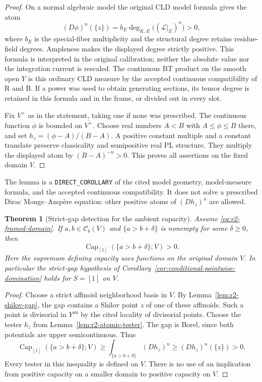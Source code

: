 \documentclass[11pt,a4paper]{article}
\numberwithin{equation}{section}
\newtheorem{theorem}{Theorem}[section]
\theoremstyle{definition}
\theoremstyle{remark}
\newcommand{\Cb}{\mathcal C_b}
\begin{document}
\begin{proof}
On a normal algebraic model the original CLD model formula gives the
atom
\[
 (D\phi)^n(\{z\})
   =b_E\deg_{\widetilde K,E}\bigl((\mathscr L|_E)^n\bigr)>0,
\]
where $b_E$ is the special-fiber multiplicity and the structural degree
retains residue-field degrees. Ampleness makes the displayed degree
strictly positive. This formula is interpreted in the original
calibration; neither the absolute value nor the integration current
is rescaled. The continuous BT product on the smooth open $Y$ is this
ordinary CLD measure by the accepted continuous compatibility of
\textup{R} and \textup{B}. If a power was used to obtain generating
sections, its tensor degree is retained in this formula and in the
frame, or divided out in every slot.

Fix $V^+$ as in the statement, taking one if none was prescribed.
The continuous function $\phi$ is bounded on $\overline {V^+}$. Choose
real numbers $A<B$ with
$A\leq\phi\leq B$ there, and set $h_z=(\phi-A)/(B-A)$. A positive
constant multiple and a constant translate preserve classicality and
semipositive real PL structure. They multiply the displayed atom by
$(B-A)^{-n}>0$. This proves all assertions on the fixed domain $V$.
\end{proof}

The lemma is a \texttt{DIRECT\_COROLLARY} of the cited model geometry,
model-measure formula, and the accepted continuous compatibility. It
does not solve a prescribed Dirac Monge--Amp\`ere equation: other
positive atoms of $(Dh_z)^n$ are allowed.

\begin{theorem}[Strict-gap detection for the ambient capacity]
\label{thm:r2-ambient-gap-detection}
Assume \eqref{eq:r2-framed-domain}. If $a,b\in\Cb(V)$ and
$\{a>b+\delta\}$ is nonempty for some $\delta\geq0$, then
\[
 \operatorname{Cap}_{[1]}(\{a>b+\delta\};V)>0.
\]
Here the supremum defining capacity uses functions on the original
domain $V$. In particular the strict-gap hypothesis of
Corollary~\ref{cor:conditional-pointwise-domination} holds for
$S=[1]$ on $V$.
\end{theorem}

\begin{proof}
Choose a strict affinoid neighborhood basis in $V$. By
Lemma~\ref{lem:r2-shilov-gap}, the gap contains a Shilov point $z$
of one of these affinoids. Such a point is divisorial in
$Y^{\mathrm{an}}$ by the cited locality of divisorial points. Choose
the tester $h_z$ from Lemma~\ref{lem:r2-atomic-tester}. The gap is
Borel, since both potentials are upper semicontinuous. Thus
\[
 \operatorname{Cap}_{[1]}(\{a>b+\delta\};V)
 \geq\int_{\{a>b+\delta\}}(Dh_z)^n
 \geq(Dh_z)^n(\{z\})>0.
\]
Every tester in this inequality is defined on $V$. There is no use of
an implication from positive capacity on a smaller domain to positive
capacity on $V$.
\end{proof}
\end{document}
